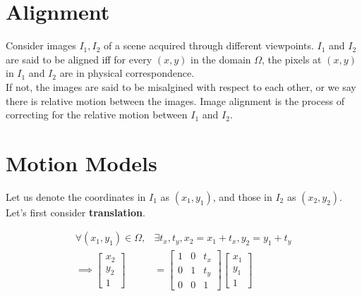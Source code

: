 \documentclass{report}
\begin{document}
\section{Alignment}

Consider images $I_1,I_2$ of a scene acquired through different viewpoints. $I_1$ and $I_2$ are said to be aligned iff for every $(x,y)$ in the domain $\Omega$, the pixels at $(x,y)$ in $I_1$ and $I_2$ are in physical correspondence. \\

If not, the images are said to be misalgined with respect to each other, or we say there is relative motion between the images. Image alignment is the process of correcting for the relative motion between $I_1$ and $I_2$.

\newpage
\section{Motion Models}

Let us denote the coordinates in $I_1$ as $(x_1,y_1)$, and those in $I_2$ as $(x_2,y_2)$. \\

Let's first consider \textbf{translation}.

\begin{align}
  \forall (x_1,y_1) \in \Omega, & \exists t_x,t_y, x_2 = x_1 + t_x, y_2 = y_1 + t_y \\
  \implies \begin{bmatrix}
             x_2 \\
             y_2 \\
             1
           \end{bmatrix}
                                & = \begin{bmatrix}
                                      1 & 0 & t_x \\
                                      0 & 1 & t_y \\
                                      0 & 0 & 1
                                    \end{bmatrix} \begin{bmatrix}
                                                    x_1 \\
                                                    y_1 \\
                                                    1
                                                  \end{bmatrix}
\end{align}
\end{document}
